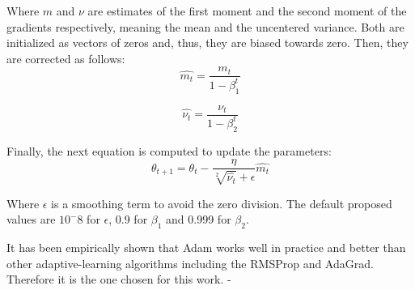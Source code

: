 Where $m$ and $\nu$ are estimates of the first moment and the second moment of the gradients respectively, meaning the mean and the uncentered variance. Both are initialized as vectors of zeros and, thus, they are biased towards zero. Then, they are corrected as follows:
\begin{equation}
\hat{m_t}=\frac{m_t}{1-\beta^t_1}
\end{equation}

\begin{equation}
\hat{\nu_t}=\frac{\nu_t}{1-\beta^t_2}
\end{equation}

Finally, the next equation is computed to update the parameters:
\begin{equation}
\theta_{t+1}=\theta_t-\frac{\eta}{\sqrt[2]{\hat{\nu_t}} + \epsilon} \hat{m_t} 
\end{equation}

Where $\epsilon$ is a smoothing term to avoid the zero division. The default proposed values are $10^-8$ for $\epsilon$, 0.9 for $\beta_1$ and 0.999 for $\beta_2$.


It has been empirically shown that Adam works well in practice and better than other adaptive-learning algorithms including the RMSProp and AdaGrad. Therefore it is the one chosen for this work.
-
